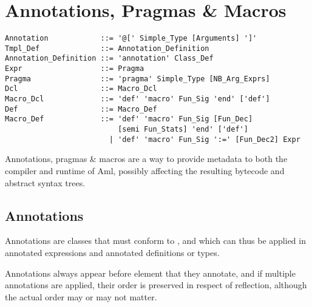 
\chapter{Annotations, Pragmas \& Macros}
\label{sec:annotations}
\label{sec:pragmas}
\label{sec:macros}

\minitoc

\newpage


\syntax\begin{lstlisting}
Annotation            ::= '@[' Simple_Type [Arguments] ']'
Tmpl_Def              ::= Annotation_Definition
Annotation_Definition ::= 'annotation' Class_Def
Expr                  ::= Pragma
Pragma                ::= 'pragma' Simple_Type [NB_Arg_Exprs]
Dcl                   ::= Macro_Dcl
Macro_Dcl             ::= 'def' 'macro' Fun_Sig 'end' ['def']
Def                   ::= Macro_Def
Macro_Def             ::= 'def' 'macro' Fun_Sig [Fun_Dec] 
                          [semi Fun_Stats] 'end' ['def']
                        | 'def' 'macro' Fun_Sig ':=' [Fun_Dec2] Expr
\end{lstlisting}

Annotations, pragmas \& macros are a way to provide metadata to both the compiler and runtime of Aml, possibly affecting the resulting bytecode and abstract syntax trees. 





\section{Annotations}

Annotations are classes that must conform to , and which can thus be applied in annotated expressions and annotated definitions or types. 

Annotations always appear before element that they annotate, and if multiple annotations are applied, their order is preserved in respect of reflection, although the actual order may or may not matter. 






